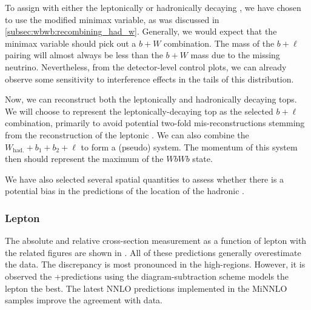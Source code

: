 To assign \bjets with either the leptonically or hadronically decaying \Wboson, we have chosen to use the modified minimax variable, as was discussed in \cref{subsec:wbwb:recombining_had_w}. Generally, we would expect that the minimax variable should pick out a \(b+W\) combination. The mass of the \( b+\ell \) pairing will almost always be less than the \(b+W\) mass due to the missing neutrino. Nevertheless, from the detector-level control plots, we can already observe some sensitivity to interference effects in the tails of this distribution. 

Now, we can reconstruct both the leptonically and hadronically decaying tops. We will choose to represent the leptonically-decaying top as the selected \( b+\ell \) combination, primarily to avoid potential two-fold mis-reconstructions stemming from the reconstruction of the leptonic \Wboson. We can also combine the \( W_{\text{had.}} + b_{1} +b_{2} + \ell \) to form a (pseudo) \ttbar system. The momentum of this system then should represent the maximum \pt of the \(WbWb\) state. 

We have also selected several spatial quantities to assess whether there is a potential bias in the predictions of the location of the hadronic \Wboson. 

\subsubsection{Lepton \texorpdfstring{\pt}{transverse momentum}}

The absolute and relative cross-section measurement as a function of lepton \pt with the related figures are shown in . All of these predictions generally overestimate the data. The discrepancy is most pronounced in the high-\pt regions. However, it is observed the \POWHEG+\Pythia[8] predictions using the diagram-subtraction scheme models the lepton \pt the best. The latest NNLO predictions implemented in the MiNNLO samples improve the agreement with data.

